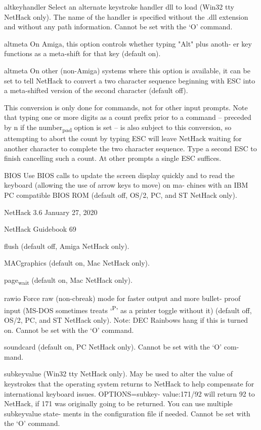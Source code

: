 \documentclass[11pt]{article}
\begin{document}
altkeyhandler
 Select an alternate keystroke handler dll to load (Win32 tty
 NetHack only). The name of the handler is specified without
 the .dll extension and without any path information. Cannot be
 set with the `O' command.

altmeta
 On Amiga, this option controls whether typing "Alt" plus anoth-
 er key functions as a meta-shift for that key (default on).

altmeta
 On other (non-Amiga) systems where this option is available, it
 can be set to tell NetHack to convert a two character sequence
 beginning with ESC into a meta-shifted version of the second
 character (default off).

This conversion is only done for commands, not for other input
prompts. Note that typing one or more digits as a count prefix
prior to a command -- preceded by n if the number\textsubscript{pad} option is
set -- is also subject to this conversion, so attempting to
abort the count by typing ESC will leave NetHack waiting for
another character to complete the two character sequence. Type
a second ESC to finish cancelling such a count.  At other
prompts a single ESC suffices.

BIOS
 Use BIOS calls to update the screen display quickly and to read
 the keyboard (allowing the use of arrow keys to move) on ma-
 chines with an IBM PC compatible BIOS ROM (default off, OS/2,
 PC, and ST NetHack only).



NetHack 3.6                   January 27, 2020





NetHack Guidebook                       69



flush
 (default off, Amiga NetHack only).

MACgraphics
 (default on, Mac NetHack only).

page\textsubscript{wait}
 (default on, Mac NetHack only).

rawio
 Force raw (non-cbreak) mode for faster output and more bullet-
 proof input (MS-DOS sometimes treats `\textsuperscript{P}' as a printer toggle
 without it) (default off, OS/2, PC, and ST NetHack only).
 Note:  DEC Rainbows hang if this is turned on. Cannot be set
 with the `O' command.

soundcard
 (default on, PC NetHack only). Cannot be set with the `O' com-
 mand.

subkeyvalue
 (Win32 tty NetHack only). May be used to alter the value of
 keystrokes that the operating system returns to NetHack to help
 compensate for international keyboard issues. OPTIONS=subkey-
 value:171/92 will return 92 to NetHack, if 171 was originally
 going to be returned. You can use multiple subkeyvalue state-
 ments in the configuration file if needed. Cannot be set with
 the `O' command.
\end{document}
